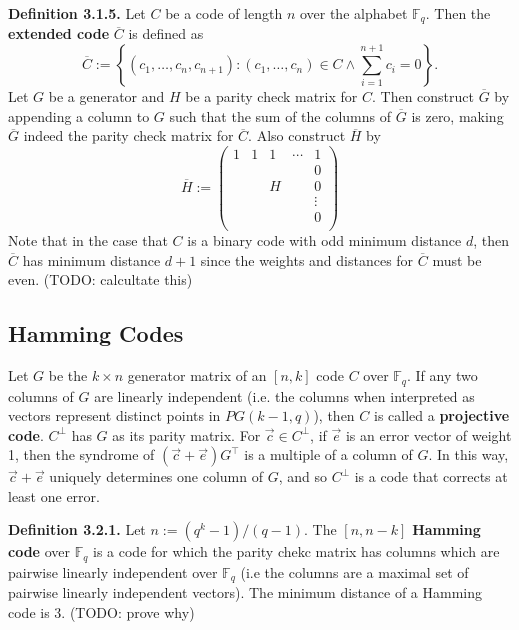 \documentclass{article}
\newcommand{\F}{\mathbb{F}}
\newcommand{\dual}[1]{#1^\bot}
\newcommand{\trans}[1]{#1^\top}
\newcommand{\extended}[1]{\overline{#1}}
\renewcommand{\=}{\equiv}
\newcommand{\set}[1]{\left\{ #1 \right\}}
\renewcommand{\v}{\vec}
\newcommand{\definition}[1]{\vspace{1em}\noindent\textbf{Definition #1.} }
\newcommand{\TODO}[1]{(TODO: #1)}
\begin{document}
\definition{3.1.5}
Let $C$ be a code of length $n$ over the alphabet $\F_q$.
Then the \textbf{extended code} $\extended{C}$ is defined as
$$ \extended{C} := \set{ (c_1, \dots, c_n, c_{n+1}) : (c_1, \dots, c_n) \in C \land \sum_{i=1}^{n+1} c_i = 0 }. $$
Let $G$ be a generator and $H$ be a parity check matrix for $C$.
Then construct $\extended{G}$ by appending a column to $G$ such that the sum of the columns of $\extended{G}$ is zero, making $\extended{G}$ indeed the parity check matrix for $\extended{C}$.
Also construct $\extended{H}$ by
\begin{equation}
  \extended{H} := \begin{pmatrix}
    1 & 1 & 1 & \cdots & 1 \\
      &   &   &       & 0 \\
      &   & H &       & 0 \\
      &   &   &       & \vdots \\
      &   &   &       & 0 \\
  \end{pmatrix}
\end{equation}
Note that in the case that $C$ is a binary code with odd minimum distance $d$, then $\extended{C}$ has minimum distance $d + 1$ since the weights and distances for $\extended{C}$ must be even.
\TODO{calcultate this}

\subsection{Hamming Codes}

Let $G$ be the $k \times n$ generator matrix of an $[n,k]$ code $C$ over $\F_q$.
If any two columns of $G$ are linearly independent (i.e. the columns when interpreted as vectors represent distinct points in $PG(k-1, q)$), then $C$ is called a \textbf{projective code}.
$\dual C$ has $G$ as its parity matrix.
For $\v c \in \dual C$, if $\v e$ is an error vector of weight 1, then the syndrome of $(\v c + \v e) \trans G$ is a multiple of a column of $G$.
In this way, $\v c + \v e$ uniquely determines one column of $G$, and so $\dual C$ is a code that corrects at least one error.

\definition{3.2.1}
Let $n := (q^k - 1)/(q - 1)$.
The $[n, n-k]$ \textbf{Hamming code} over $\F_q$ is a code for which the parity chekc matrix has columns which are pairwise linearly independent over $\F_q$ (i.e the columns are a maximal set of pairwise linearly independent vectors).
The minimum distance of a Hamming code is 3. \TODO{prove why}
\end{document}
